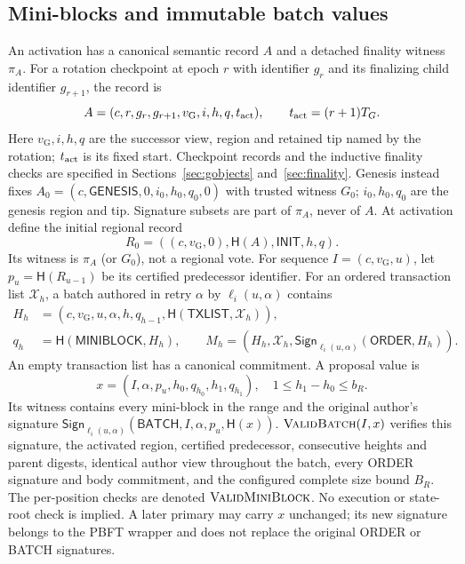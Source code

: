 \documentclass[11pt,a4paper,onecolumn]{article}
\newcommand{\Hash}{\mathsf H}
\newcommand{\Sig}{\mathsf{Sign}}
\newcommand{\gv}{v_{\mathrm G}}
\newcommand{\Tag}[1]{\mathsf{#1}}
\newcommand{\Proc}[1]{\textnormal{\textsc{#1}}}
\theoremstyle{remark}\newtheorem{example}[definition]{Example}
\begin{document}
\subsection{Mini-blocks and immutable batch values}
An activation has a canonical semantic record $A$ and a detached finality
witness $\pi_A$. For a rotation checkpoint at epoch $r$ with identifier $g_r$
and its finalizing child identifier $g_{r+1}$, the record is
\[
 A=(c,r,g_r,g_{r+1},\gv,i,h,q,t_{\rm act}),\qquad
 t_{\rm act}=(r+1)T_G.
\]
Here $\gv,i,h,q$ are the successor view, region and retained tip named by the
rotation; $t_{\rm act}$ is its fixed start. Checkpoint records and the inductive finality checks are specified in
Sections~\ref{sec:gobjects} and~\ref{sec:finality}. Genesis instead
fixes $A_0=(c,\Tag{GENESIS},0,i_0,h_0,q_0,0)$ with trusted witness $G_0$;
$i_0,h_0,q_0$ are the genesis region and tip. Signature subsets are part of
$\pi_A$, never of $A$. At activation define the initial regional record
\[
 R_0=((c,\gv,0),\Hash(A),\Tag{INIT},h,q).
\]
Its witness is $\pi_A$ (or $G_0$), not a regional vote. For sequence
$I=(c,\gv,u)$, let $p_u=\Hash(R_{u-1})$ be its certified predecessor identifier.
For an ordered transaction list $\mathcal X_h$, a batch authored in retry
$\alpha$ by $\ell_i(u,\alpha)$ contains
\begin{align}
 H_h&=(c,\gv,u,\alpha,h,q_{h-1},\Hash(\Tag{TXLIST},\mathcal X_h)),\label{eq:block}\\
 q_h&=\Hash(\Tag{MINIBLOCK},H_h),\qquad
 M_h=(H_h,\mathcal X_h,\Sig_{\ell_i(u,\alpha)}(\Tag{ORDER},H_h)).\nonumber
\end{align}
An empty transaction list has a canonical commitment. A proposal value is
\begin{equation}\label{eq:proposal}
 x=(I,\alpha,p_u,h_0,q_{h_0},h_1,q_{h_1}),\quad 1\leq h_1-h_0\leq b_R.
\end{equation}
Its witness contains every mini-block in the range and the original author's
signature $\Sig_{\ell_i(u,\alpha)}(\Tag{BATCH},I,\alpha,p_u,\Hash(x))$.
$\Proc{ValidBatch}(I,x)$ verifies this signature, the activated region,
certified predecessor, consecutive heights and parent digests, identical author
view throughout the batch, every ORDER signature and body commitment, and the
configured complete size bound $B_R$. The per-position checks are denoted
$\Proc{ValidMiniBlock}$. No execution or state-root check is implied.
A later primary may carry $x$ unchanged; its new signature belongs to the PBFT
wrapper and does not replace the original ORDER or BATCH signatures.
\end{document}
